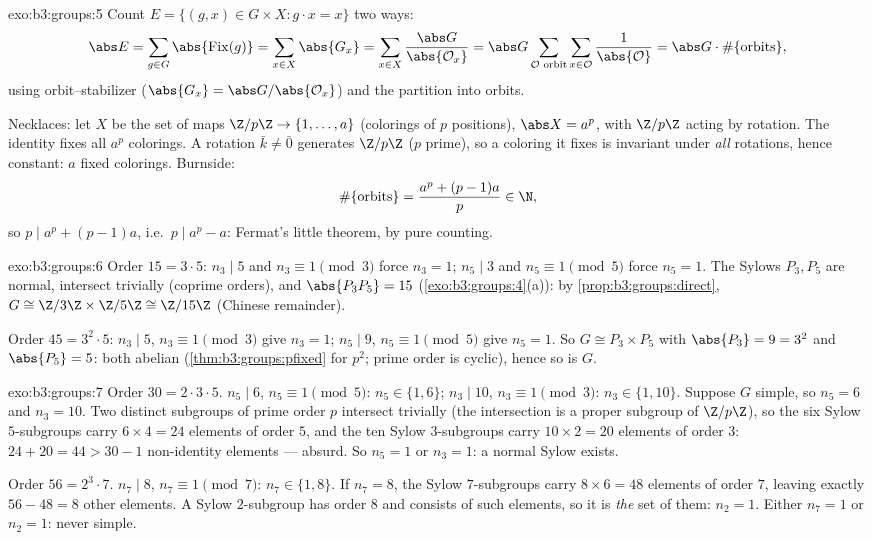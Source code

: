 \begin{solution}{exo:b3:groups:5}
Count $E = \{(g,x) \in G \times X : g \cdot x = x\}$ two ways:
\[
\abs E = \sum_{g \in G} \abs{\operatorname{Fix}(g)}
= \sum_{x \in X} \abs{G_x}
= \sum_{x \in X} \frac{\abs G}{\abs{\mathcal O_x}}
= \abs G \sum_{\mathcal O \text{ orbit}} \sum_{x \in \mathcal O}
\frac{1}{\abs{\mathcal O}}
= \abs G \cdot \#\{\text{orbits}\},
\]
using orbit--stabilizer ($\abs{G_x} = \abs G/\abs{\mathcal O_x}$)
and the partition into orbits.

Necklaces: let $X$ be the set of maps $\Z/p\Z \to
\{1, \dots, a\}$ (colorings of $p$ positions), $\abs X = a^p$,
with $\Z/p\Z$ acting by rotation. The identity fixes all $a^p$
colorings. A rotation $\bar k \neq \bar 0$ generates $\Z/p\Z$ ($p$
prime), so a coloring it fixes is invariant under \emph{all}
rotations, hence constant: $a$ fixed colorings. Burnside:
\[
\#\{\text{orbits}\} = \frac{a^p + (p-1)a}{p} \in \N ,
\]
so $p \mid a^p + (p-1)a$, i.e.\ $p \mid a^p - a$: Fermat's little
theorem, by pure counting.
\end{solution}

\begin{solution}{exo:b3:groups:6}
Order $15 = 3 \cdot 5$: $n_3 \mid 5$ and $n_3 \equiv 1 \pmod 3$
force $n_3 = 1$; $n_5 \mid 3$ and $n_5 \equiv 1 \pmod 5$ force
$n_5 = 1$. The Sylows $P_3, P_5$ are normal, intersect trivially
(coprime orders), and $\abs{P_3P_5} = 15$
(\cref{exo:b3:groups:4}(a)): by \cref{prop:b3:groups:direct}, $G
\cong \Z/3\Z \times \Z/5\Z \cong \Z/15\Z$ (Chinese remainder).

Order $45 = 3^2 \cdot 5$: $n_3 \mid 5$, $n_3 \equiv 1 \pmod 3$
give $n_3 = 1$; $n_5 \mid 9$, $n_5 \equiv 1 \pmod 5$ give $n_5 =
1$. So $G \cong P_3 \times P_5$ with $\abs{P_3} = 9 = 3^2$ and
$\abs{P_5} = 5$: both abelian (\cref{thm:b3:groups:pfixed} for
$p^2$; prime order is cyclic), hence so is $G$.
\end{solution}

\begin{solution}{exo:b3:groups:7}
Order $30 = 2 \cdot 3 \cdot 5$. $n_5 \mid 6$, $n_5 \equiv 1 \pmod
5$: $n_5 \in \{1, 6\}$; $n_3 \mid 10$, $n_3 \equiv 1 \pmod 3$:
$n_3 \in \{1, 10\}$. Suppose $G$ simple, so $n_5 = 6$ and $n_3 =
10$. Two distinct subgroups of prime order $p$ intersect trivially
(the intersection is a proper subgroup of $\Z/p\Z$), so the six
Sylow $5$-subgroups carry $6 \times 4 = 24$ elements of order $5$,
and the ten Sylow $3$-subgroups carry $10 \times 2 = 20$ elements
of order $3$: $24 + 20 = 44 > 30 - 1$ non-identity elements ---
absurd. So $n_5 = 1$ or $n_3 = 1$: a normal Sylow exists.

Order $56 = 2^3 \cdot 7$. $n_7 \mid 8$, $n_7 \equiv 1 \pmod 7$:
$n_7 \in \{1, 8\}$. If $n_7 = 8$, the Sylow $7$-subgroups carry $8
\times 6 = 48$ elements of order $7$, leaving exactly $56 - 48 =
8$ other elements. A Sylow $2$-subgroup has order $8$ and consists
of such elements, so it is \emph{the} set of them: $n_2 = 1$.
Either $n_7 = 1$ or $n_2 = 1$: never simple.
\end{solution}

